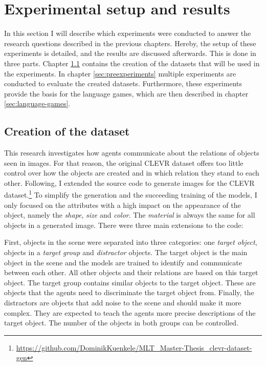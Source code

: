 \section{Experimental setup and results}
\label{sec:exp-setup}

In this section I will describe which experiments were conducted to answer the research questions described in the previous chapters.
Hereby, the setup of these experiments is detailed, and the results are discussed afterwards.
This is done in three parts.
Chapter \ref{sec:creation-dataset} contains the creation of the datasets that will be used in the experiments.
In chapter \ref{sec:preexperiments} multiple experiments are conducted to evaluate the created datasets.
Furthermore, these experiments provide the basis for the language games, which are then described in chapter \ref{sec:language-games}.


\subsection{Creation of the dataset}
\label{sec:creation-dataset}

This research investigates how agents communicate about the relations of objects seen in images.
For that reason, the original CLEVR dataset offers too little control over how the objects are created and in which relation they stand to each other.
Following, I extended the source code to generate images for the CLEVR dataset.\footnote{\href{https://github.com/DominikKuenkele/MLT\_Master-Thesis\_clevr-dataset-gen}{https://github.com/DominikKuenkele/MLT\_Master-Thesis\_clevr-dataset-gen}}
To simplify the generation and the succeeding training of the models, I only focused on the attributes with a high impact on the appearance of the object, namely the \emph{shape}, \emph{size} and \emph{color}.
The \emph{material} is always the same for all objects in a generated image.
There were three main extensions to the code:

First, objects in the scene were separated into three categories: one \emph{target object}, objects in a \emph{target group} and \emph{distractor} objects.
The target object is the main object in the scene and the models are trained to identify and communicate between each other.
All other objects and their relations are based on this target object.
The target group contains similar objects to the target object.
These are objects that the agents need to discriminate the target object from.
Finally, the distractors are objects that add noise to the scene and should make it more complex. They are expected to teach the agents more precise descriptions of the target object.
The number of the objects in both groups can be controlled.

